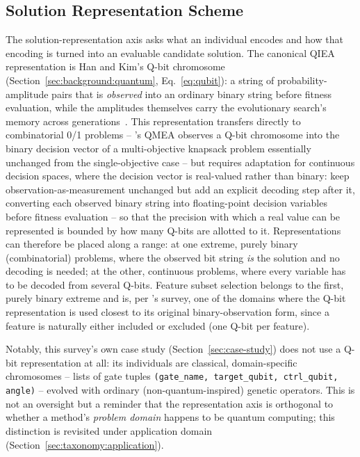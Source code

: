 \subsection{Solution Representation Scheme}
\label{sec:taxonomy:representation}

The solution-representation axis asks what an individual encodes and how that
encoding is turned into an evaluable candidate solution. The canonical
QIEA representation is Han and Kim's Q-bit chromosome
(Section~\ref{sec:background:quantum}, Eq.~\ref{eq:qubit}): a string of
probability-amplitude pairs that is \emph{observed} into an ordinary
binary string before fitness evaluation, while the amplitudes themselves
carry the evolutionary search's memory across
generations~\citep{han2002qea}. This representation transfers directly
to combinatorial 0/1 problems -- \citet{kim2006qmea}'s QMEA observes a
Q-bit chromosome into the binary decision vector of a multi-objective
knapsack problem essentially unchanged from the single-objective case --
but requires adaptation for continuous decision spaces, where the
decision vector is real-valued rather than binary:
\citet{olvera2023continuous} keep observation-as-measurement unchanged
but add an explicit decoding step after it, converting each observed
binary string into floating-point decision variables before fitness
evaluation -- so that the precision with which a real value can be
represented is bounded by how many Q-bits are allotted to it.
Representations can therefore be placed along a range: at one extreme,
purely binary (combinatorial) problems, where the observed bit string
\emph{is} the solution and no decoding is needed; at the other,
continuous problems, where every variable has to be decoded from
several Q-bits. Feature subset selection belongs to the first, purely
binary extreme and is, per \citet{vivek2025fss}'s survey, one of the
domains where the Q-bit representation is used closest to its original
binary-observation form, since a feature is naturally either included
or excluded (one Q-bit per feature).

Notably, this survey's own case study (Section~\ref{sec:case-study}) does
not use a Q-bit representation at all: its individuals are classical,
domain-specific chromosomes -- lists of gate tuples
\texttt{(gate\_name, target\_qubit, ctrl\_qubit, angle)} -- evolved with
ordinary (non-quantum-inspired) genetic operators. This is not an
oversight but a reminder that the representation axis is orthogonal to
whether a method's \emph{problem domain} happens to be quantum computing;
this distinction is revisited under application domain
(Section~\ref{sec:taxonomy:application}).

